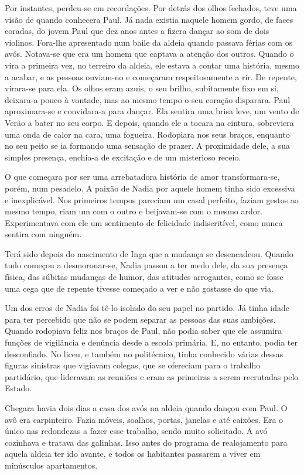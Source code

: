 Por instantes, perdeu-se em recordações. Por detrás dos olhos fechados,
teve uma visão de quando conhecera Paul. Já nada existia naquele homem
gordo, de faces coradas, do jovem Paul que dez anos antes a fizera
dançar ao som de dois violinos. Fora-lhe apresentado num baile da aldeia
quando passava férias com os avós. Notava-se que era um homem que
captava a atenção dos outros. Quando o vira a primeira vez, no terreiro
da aldeia, ele estava a contar
uma história, mesmo a acabar, e as pessoas ouviam-no e começaram
respeitosamente a rir. De repente, virara-se para ela. Os olhos eram
azuis, o seu brilho, subitamente fixo em si, deixara-a pouco à vontade,
mas ao mesmo tempo o seu coração disparara. Paul aproximara-se e
convidara-a para dançar. Ela sentira uma brisa leve, um vento de Verão a
bater no seu corpo. E depois, quando ele a tocara na cintura, sobreviera
uma onda de calor na cara, uma fogueira. Rodopiara nos seus braços,
enquanto no seu peito se ia formando uma sensação de prazer. A proximidade dele, a sua simples presença, enchia-a de excitação e de um
misterioso receio.

O que começara por ser uma arrebatadora história de amor
transformara-se, porém, num pesadelo. A paixão de Nadia por aquele homem
tinha sido excessiva e inexplicável. Nos primeiros tempos pareciam um
casal perfeito, faziam gestos ao mesmo tempo, riam um com o outro e
beijavam-se com o mesmo ardor. Experimentava com ele um sentimento de
felicidade indiscritível, como nunca sentira com ninguém.

Terá sido depois do nascimento de Inga que a mudança se desencadeou.
Quando tudo começou a desmoronar-se, Nadia passou a ter medo dele, da
sua presença física, das súbitas mudanças de humor, das atitudes
arrogantes, como se fosse uma cega que de repente tivesse começado a ver
e não gostasse do que via.

Um dos erros de Nadia foi tê-lo isolado do seu papel no partido. Já
tinha idade para ter percebido que não se podem separar as pessoas das
suas ambições. Quando rodopiava feliz nos braços de Paul, não podia
saber que ele assumira funções de vigilância e denúncia desde a escola primária.
E, no entanto, podia ter desconfiado. No liceu, e também no politécnico,
tinha conhecido várias dessas figuras sinistras que vigiavam colegas,
que se ofereciam para o trabalho partidário, que lideravam as reuniões
e eram as primeiras a serem recrutadas pelo Estado.

Chegara havia dois dias a casa dos avós na aldeia quando dançou com
Paul. O avô era carpinteiro. Fazia móveis, soalhos, portas, janelas e
até caixões. Era o único nas redondezas a fazer esse trabalho, sendo
muito solicitado. A avó cozinhava e tratava das galinhas. Isso antes
do programa de realojamento para aquela aldeia ter ido avante, e todos
os habitantes passarem a viver em minúsculos apartamentos.

